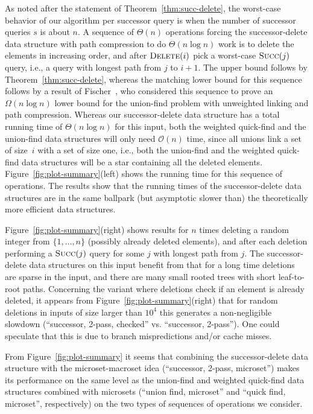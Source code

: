 \documentclass[a4paper]{lipics-v2021}
\newcommand{\Oh}{\mathcal{O}}
\newcommand{\FuncName}[1]{\textup{\textsc{#1}}}
\newcommand{\Delete}{\FuncName{Delete}}
\newcommand{\Succ}{\FuncName{Succ}}
\begin{document}
As noted after the statement of Theorem~\ref{thm:succ-delete}, the worst-case behavior of our algorithm per successor query is when the number of successor queries $s$ is about $n$. A sequence of $\Theta(n)$ operations forcing the successor-delete data structure with path compression to do $\Theta(n\log n)$ work is to delete the elements in increasing order, and after $\Delete(i)$ pick a worst-case $\Succ(j)$ query, i.e., a query with longest path from $j$ to $i+1$. The upper bound follows by Theorem~\ref{thm:succ-delete}, whereas the matching lower bound for this sequence follows by a result of Fischer~\cite[Theorem~1]{Fischer72}, who considered this sequence to prove an $\Omega(n\log n)$ lower bound for the union-find problem with unweighted linking and path compression. Whereas our successor-delete data structure has a total running time of $\Theta(n\log n)$ for this input, both the weighted quick-find and the union-find data structures will only need $\Oh(n)$ time, since all unions link a set of size~$i$ with a set of size one, i.e., both the union-find and the weighted quick-find data structures will be a star containing all the deleted elements. Figure~\ref{fig:plot-summary}(left) shows the running time for this sequence of operations. The results show that the running times of the successor-delete data structures are in the same ballpark (but asymptotic slower than) the theoretically more efficient data structures.

Figure~\ref{fig:plot-summary}(right) shows results for $n$ times deleting a random integer from $\{1,\ldots,n\}$ (possibly already deleted elements), and after each deletion performing a $\Succ(j)$ query for some $j$ with longest path from $j$. The successor-delete data structures on this input benefit from that for a long time deletions are sparse in the input, and there are many small rooted trees with short leaf-to-root paths. Concerning the variant where deletions check if an element is already deleted, it appears from Figure~\ref{fig:plot-summary}(right) that for random deletions in  inputs of size larger than $10^4$ this generates a non-negligible slowdown  (``successor, 2-pass, checked'' vs. ``successor, 2-pass''). One could speculate that this is due to branch mispredictions and/or cache misses.

From Figure~\ref{fig:plot-summary} it seems that combining the successor-delete data structure with the microset-macroset idea (``successor, 2-pass, microset'') makes its performance on the same level as the union-find and weighted quick-find data structures combined with microsets (``union find, microset'' and ``quick find, microset'', respectively) on the two types of sequences of operations we consider.
\end{document}
